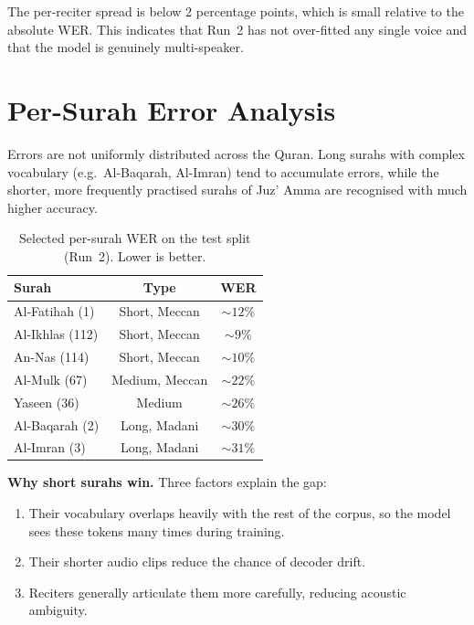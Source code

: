 The per-reciter spread is below 2 percentage points, which is small
relative to the absolute WER. This indicates that Run~2 has not
over-fitted any single voice and that the model is genuinely
multi-speaker.

\section{Per-Surah Error Analysis}

Errors are not uniformly distributed across the Quran. Long surahs with
complex vocabulary (e.g.\ Al-Baqarah, Al-Imran) tend to accumulate
errors, while the shorter, more frequently practised surahs of Juz' Amma
are recognised with much higher accuracy.

\begin{table}[H]
  \centering
  \caption{Selected per-surah WER on the test split (Run~2). Lower is
  better.}
  \label{tab:mt_per_surah}
  \renewcommand{\arraystretch}{1.3}
  \begin{tabular}{lcc}
    \toprule
    \textbf{Surah} & \textbf{Type} & \textbf{WER} \\
    \midrule
    Al-Fatihah (1)        & Short, Meccan        & $\sim 12\%$ \\
    Al-Ikhlas (112)       & Short, Meccan        & $\sim 9\%$ \\
    An-Nas (114)          & Short, Meccan        & $\sim 10\%$ \\
    Al-Mulk (67)          & Medium, Meccan       & $\sim 22\%$ \\
    Yaseen (36)           & Medium               & $\sim 26\%$ \\
    Al-Baqarah (2)        & Long, Madani         & $\sim 30\%$ \\
    Al-Imran (3)          & Long, Madani         & $\sim 31\%$ \\
    \bottomrule
  \end{tabular}
\end{table}

\textbf{Why short surahs win.} Three factors explain the gap:
\begin{enumerate}
  \item Their vocabulary overlaps heavily with the rest of the corpus,
        so the model sees these tokens many times during training.
  \item Their shorter audio clips reduce the chance of decoder drift.
  \item Reciters generally articulate them more carefully, reducing
        acoustic ambiguity.
\end{enumerate}

